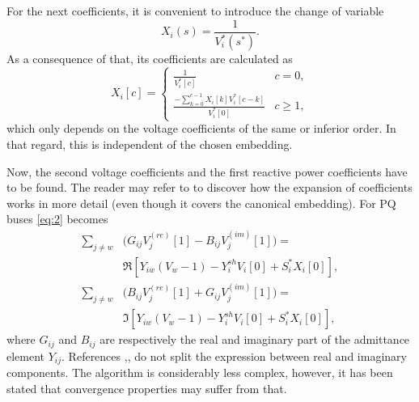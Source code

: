 \documentclass[conference]{IEEEtran}
\begin{document}
For the next coefficients, it is convenient to introduce the change of variable
\begin{equation}
  X_i(s)=\frac{1}{V^*_i(s^*)}.
  \label{eq:12}
\end{equation}
As a consequence of that, its coefficients are calculated as
\begin{equation}
  X_i[c]=
  \begin{cases}
    \frac{1}{V^*_i[c]} & c=0,\\
    \frac{-\sum_{k=0}^{c-1}X_i[k]V^*_i[c-k]}{V^*_i[0]} & c\geq 1,
  \end{cases}
  \label{eq:13}
\end{equation}
which only depends on the voltage coefficients of the same or inferior order. In that regard, this is independent of the chosen embedding.

Now, the second voltage coefficients and the first reactive power coefficients have to be found. The reader may refer to \cite{Tylavsky1} to discover how the expansion of coefficients works in more detail (even though it covers the canonical embedding). For PQ buses \eqref{eq:2} becomes
\begin{equation}
  \begin{split}
    \sum_{j\neq w}&\biggl(G_{ij}V^{(re)}_j[1]-B_{ij}V^{(im)}_j[1]\biggr)=\\
    &\Re[Y_{iw}(V_w-1) - Y^{sh}_iV_i[0]+S^*_iX_i[0]],\\
    \sum_{j\neq w}&\biggl(B_{ij}V^{(re)}_j[1]+G_{ij}V^{(im)}_j[1]\biggr)=\\
    &\Im[Y_{iw}(V_w-1) - Y^{sh}_iV_i[0]+S^*_iX_i[0]],
  \end{split}
  \label{eq:14}
\end{equation}
where $G_{ij}$ and $B_{ij}$ are respectively the real and imaginary part of the admittance element $Y_{ij}$. References \cite{Novel},\cite{Schmidt},\cite{subramanianPV} do not split the expression between real and imaginary components. The algorithm is considerably less complex, however, it has been stated that convergence properties may suffer from that.
\end{document}
